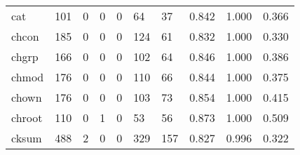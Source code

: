 \begin{longtable}{lp{1.3cm}p{1.3cm}p{1.3cm}p{1.3cm}p{1.3cm}p{1.3cm}p{1.3cm}p{1.3cm}p{1.3cm}}
cat       &                    101 &                                             0 &                                            0 &                                           0 &                                           64 &                                         37 &                                0.842 &                                  1.000 &                                0.366 \\
chcon     &                    185 &                                             0 &                                            0 &                                           0 &                                          124 &                                         61 &                                0.832 &                                  1.000 &                                0.330 \\
chgrp     &                    166 &                                             0 &                                            0 &                                           0 &                                          102 &                                         64 &                                0.846 &                                  1.000 &                                0.386 \\
chmod     &                    176 &                                             0 &                                            0 &                                           0 &                                          110 &                                         66 &                                0.844 &                                  1.000 &                                0.375 \\
chown     &                    176 &                                             0 &                                            0 &                                           0 &                                          103 &                                         73 &                                0.854 &                                  1.000 &                                0.415 \\
chroot    &                    110 &                                             0 &                                            1 &                                           0 &                                           53 &                                         56 &                                0.873 &                                  1.000 &                                0.509 \\
cksum     &                    488 &                                             2 &                                            0 &                                           0 &                                          329 &                                        157 &                                0.827 &                                  0.996 &                                0.322 \\

\end{longtable}

